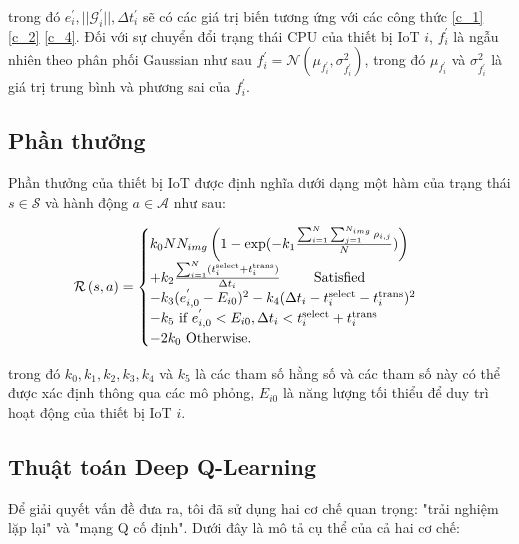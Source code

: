 \documentclass{article} %
\begin{document}
trong đó $e_i^{'}, ||\mathcal{G}_{i}^{'}||, \Delta t_i^{'}$ sẽ có các giá trị biến tương ứng với các công thức \ref{c_1} \ref{c_2} \ref{c_4}. Đối với sự chuyển đổi trạng thái CPU của thiết bị IoT $i$, $f_i^{'}$ là ngẫu nhiên theo phân phối Gaussian như sau $f_i^{'} = \mathcal{N}( \mu_{f_i^{'}}, \sigma^2_{f_i^{'}})$, trong đó $\mu_{f_i^{'}}$ và $\sigma^2_{f_i^{'}}$ là giá trị trung bình và phương sai của $f_i^{'}$.


\subsection{Phần thưởng}
Phần thưởng của thiết bị IoT được định nghĩa dưới dạng một hàm của trạng thái $s\in\mathcal{S}$ và hành động $a\in\mathcal{A}$ như sau:

\begin{align}
\mathcal{R}\left ( s,a \right ) &= 
  \begin{cases}
    k_0 N N_{img} \left(1- \exp(-k_1 \frac{\sum_{i=1}^{N} \sum_{j=1}^{N_{img}}  \rho_{i,j}}{N}) \right) \\ + k_2\frac{\sum_{i=1}^{N} (t_i^{\rm{select}} + t_i^{\rm{trans}})}{\Delta t_{i}}  \hphantom{-\sqrt{-}}  \text{Satisfied } \\
    -k_3(e^{'}_{i,0} - E_{i0})^2 - k_4(\Delta t_i - t_i^{\rm{select}} - t_i^{\rm{trans}})^2 \\ - k_5 \text{ if } e^{'}_{i,0} < E_{i0}, \Delta t_i < t_i^{\rm{select}}  + t_i^{\rm{trans}}\\
    -2k_0   \text{ Otherwise}.
  \end{cases}
  \label{value_func}
\end{align}

trong đó $k_0,k_1,k_2,k_3,k_4$ và $k_5$ là các tham số hằng số và các tham số này có thể được xác định thông qua các mô phỏng, $E_{i0}$ là năng lượng tối thiểu để duy trì hoạt động của thiết bị IoT $i$.

\subsection{Thuật toán Deep Q-Learning}

Để giải quyết vấn đề đưa ra, tôi đã sử dụng hai cơ chế quan trọng: "trải nghiệm lặp lại" và "mạng Q cố định". Dưới đây là mô tả cụ thể của cả hai cơ chế:
\end{document}
